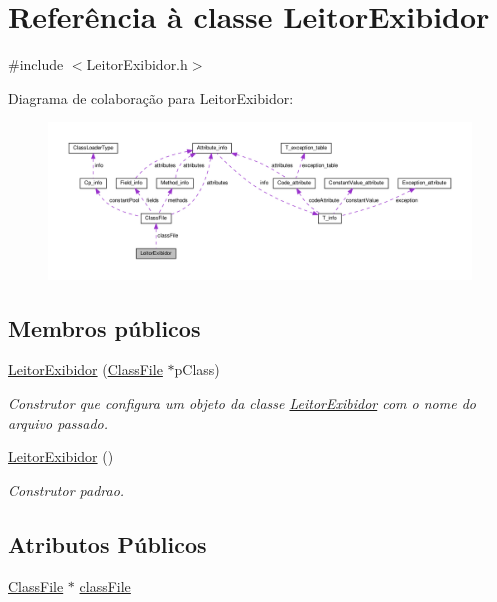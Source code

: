 \hypertarget{classLeitorExibidor}{}\section{Referência à classe Leitor\+Exibidor}
\label{classLeitorExibidor}


{\ttfamily \#include $<$Leitor\+Exibidor.\+h$>$}



Diagrama de colaboração para Leitor\+Exibidor\+:\nopagebreak
\begin{figure}[H]
\begin{center}
\leavevmode
\includegraphics[width=350pt]{classLeitorExibidor__coll__graph}
\end{center}
\end{figure}
\subsection*{Membros públicos}
\begin{DoxyCompactItemize}
\item 
\hyperlink{classLeitorExibidor_a3a925accb2da9a51859f02005737e58f}{Leitor\+Exibidor} (\hyperlink{classClassFile}{Class\+File} $\ast$p\+Class)
\begin{DoxyCompactList}\small\item\em Construtor que configura um objeto da classe \hyperlink{classLeitorExibidor}{Leitor\+Exibidor} com o nome do arquivo passado. \end{DoxyCompactList}\item 
\hyperlink{classLeitorExibidor_a246be764c0b6895539f915cc0f813e7b}{Leitor\+Exibidor} ()
\begin{DoxyCompactList}\small\item\em Construtor padrao. \end{DoxyCompactList}\end{DoxyCompactItemize}
\subsection*{Atributos Públicos}
\begin{DoxyCompactItemize}
\item 
\hyperlink{classClassFile}{Class\+File} $\ast$ \hyperlink{classLeitorExibidor_abd4251746a10c01f8bb566c4d6ba55b4}{class\+File}
\end{DoxyCompactItemize}


